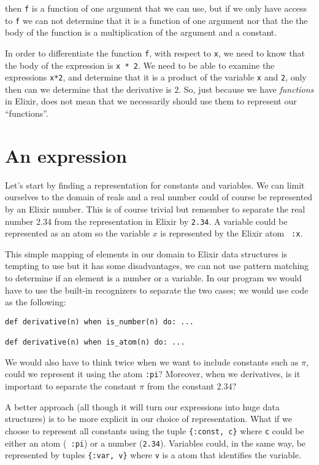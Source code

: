 \documentclass[a4paper,11pt]{article}
\begin{document}
\noindent then {\tt f} is a function of one argument that we can use, but if we
only have access to {\tt f} we can not determine that it is a function
of one argument nor that the the body of the function is a
multiplication of the argument and a constant.

In order to differentiate the function {\tt f}, with respect to {\tt x}, we
need to know that the body of the expression is {\tt x * 2}. We need to
be able to examine the expressions {\tt x*2}, and determine that it is
a product of the variable {\tt x} and {\tt 2}, only then can we
determine that the derivative is $2$. So, just because we have {\em
    functions} in Elixir, does not mean that we necessarily should use
them to represent our ``functions''.



\section{An expression}

Let's start by finding a representation for constants and
variables. We can limit ourselves to the domain of reals and a real
number could of course be represented by an Elixir number. This is of
course trivial but remember to separate the real number $2.34$ from the
representation in Elixir by {\tt 2.34}. A variable could be represented
as an atom so the variable $x$ is represented by the Elixir atom {\tt
    :x}.

This simple mapping of elements in our domain to Elixir data structures
is tempting to use but it has some disadvantages, we can not use
pattern matching to determine if an element is a number or a
variable. In our program we would have to use the built-in recognizers
to separate the two cases; we would use code as the following:

\begin{verbatim}
def derivative(n) when is_number(n) do: ...

def derivative(n) when is_atom(n) do: ...
\end{verbatim}

We would also have to think twice when we want to include constants
such as $\pi$, could we represent it using the atom {\tt :pi}?
Moreover, when we derivatives, is it important to separate the
constant $\pi$ from the constant $2.34$?

A better approach (all though it will turn our expressions into huge
data structures) is to be more explicit in our choice of
representation. What if we choose to represent all constants using the
tuple {\tt\{:const, c\}} where {\tt c} could be either an atom ({\tt
    :pi}) or a number ({\tt 2.34}). Variables could, in the same way, be
represented by tuples {\tt \{:var, v\}} where {\tt v} is a atom that
identifies the variable.
\end{document}
